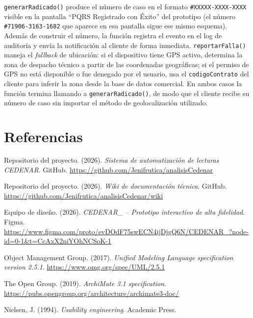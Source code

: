 \documentclass[12pt, a4paper]{article}
\begin{document}
\noindent \texttt{generarRadicado()} produce el número de caso en el formato \texttt{\#XXXXX-XXXX-XXXX} visible en la pantalla ``PQRS Registrado con Éxito'' del prototipo (el número \texttt{\#71906-3163-1682} que aparece en esa pantalla sigue ese mismo esquema). Además de construir el número, la función registra el evento en el log de auditoría y envía la notificación al cliente de forma inmediata. \texttt{reportarFalla()} maneja el \textit{fallback} de ubicación: si el dispositivo tiene GPS activo, determina la zona de despacho técnico a partir de las coordenadas geográficas; si el permiso de GPS no está disponible o fue denegado por el usuario, usa el \texttt{codigoContrato} del cliente para inferir la zona desde la base de datos comercial. En ambos casos la función termina llamando a \texttt{generarRadicado()}, de modo que el cliente recibe su número de caso sin importar el método de geolocalización utilizado.

\newpage
\section*{Referencias}

\noindent Repositorio del proyecto. (2026). \textit{Sistema de automatización de lecturas CEDENAR}. GitHub. \url{https://github.com/Jenifrutica/analisisCedenar}

\vspace{6pt}
\noindent Repositorio del proyecto. (2026). \textit{Wiki de documentación técnica}. GitHub. \url{https://github.com/Jenifrutica/analisisCedenar/wiki}

\vspace{6pt}
\noindent Equipo de diseño. (2026). \textit{CEDENAR\_ -- Prototipo interactivo de alta fidelidad}. Figma. \url{https://www.figma.com/proto/evDOdF75swECN4ijDjgQ6N/CEDENAR_?node-id=0-1&t=CcAxX2niYOhNCSoK-1}

\vspace{6pt}
\noindent Object Management Group. (2017). \textit{Unified Modeling Language specification version 2.5.1}. \url{https://www.omg.org/spec/UML/2.5.1}

\vspace{6pt}
\noindent The Open Group. (2019). \textit{ArchiMate 3.1 specification}. \url{https://pubs.opengroup.org/architecture/archimate3-doc/}

\vspace{6pt}
\noindent Nielsen, J. (1994). \textit{Usability engineering}. Academic Press.
\end{document}
